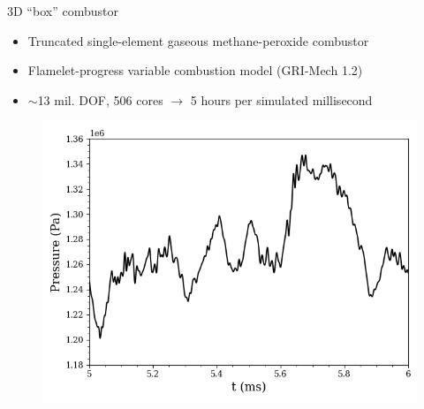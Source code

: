 \documentclass[]{beamer}
\begin{document}
\begin{frame}{3D ``box'' combustor\footnotemark[12]}
	\begin{itemize}
		\item Truncated single-element gaseous methane-peroxide combustor
		\item Flamelet-progress variable combustion model (GRI-Mech 1.2)
		\item $\sim$13 mil. DOF, 506 cores $\rightarrow$ 5 hours per simulated millisecond
	\end{itemize}
	\begin{minipage}{0.49\linewidth}
		\begin{figure}
		\end{figure}
	\end{minipage}
	\begin{minipage}{0.49\linewidth}
		\begin{figure}
			\includegraphics[width=0.95\linewidth]{experiments/box/point_1_Static_Pressure_FOM.png}
		\end{figure}
	\end{minipage}
\end{frame}
\end{document}

